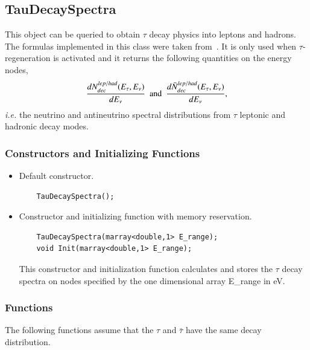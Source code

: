 \documentclass[3p,12pt]{elsarticle}
\newcommand{\ttf}{\ttfamily}
\begin{document}
\subsection{TauDecaySpectra\label{sec:tau_decay_spectra}}

This object can be queried to obtain $\tau$ decay physics into leptons
and hadrons. The formulas implemented in this class were taken
from~\citep{Dutta:2000jv}. It is only used when $\tau$-regeneration is
activated and it returns the following quantities on the energy
nodes, 
\begin{equation}
\frac{dN^{lep/had}_{dec} (E_\tau, E_\nu)}{dE_\nu} {\rm ~~and~~ }
\frac{d\bar{N}^{lep/had}_{dec} (E_\tau, E_\nu)}{dE_\nu},
\label{eqn:tau-dist}
\end{equation}
{\it i.e.} the neutrino and antineutrino spectral distributions from $\tau$
leptonic and hadronic decay modes.

\subsubsection{Constructors and Initializing Functions}

\begin{itemize}
\item Default constructor.
  \begin{lstlisting}
    TauDecaySpectra();
  \end{lstlisting}
\item Constructor and initializing function with memory reservation.
  \begin{lstlisting}
    TauDecaySpectra(marray<double,1> E_range);
    void Init(marray<double,1> E_range);
  \end{lstlisting}
This constructor and initialization function calculates and stores the
$\tau$ decay spectra on nodes specified by the one dimensional array
{\ttf E\_range} in eV.
\end{itemize}

\subsubsection{Functions}

The following functions assume that the $\tau$ and $\bar{\tau}$ have
the same decay distribution. 
\end{document}
